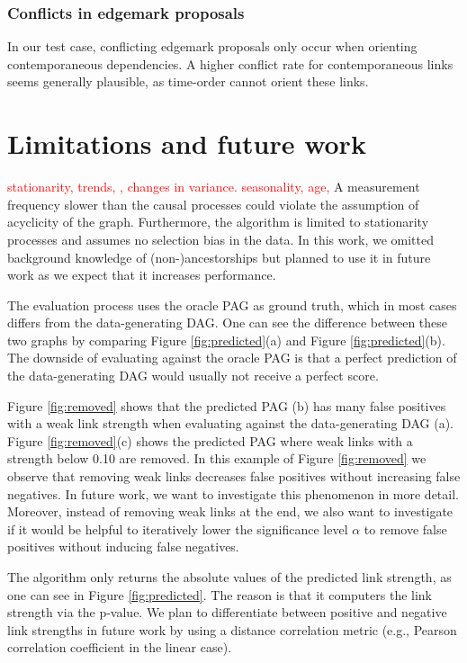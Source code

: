 \documentclass[conference]{IEEEtran}
\begin{document}
\subsubsection{Conflicts in edgemark proposals}
In our test case, conflicting edgemark proposals only occur when orienting contemporaneous dependencies. A higher conflict rate for contemporaneous links seems generally plausible, as time-order cannot orient these links.



\section{Limitations and future work}
\textcolor{red}{stationarity, trends, , changes in variance. seasonality, age, }
A measurement frequency slower than the causal processes could violate the assumption of acyclicity of the graph. 
Furthermore, the algorithm is limited to stationarity processes and assumes no selection bias in the data.
In this work, we omitted background knowledge of (non-)ancestorships but planned to use it in future work as we expect that it increases performance.

The evaluation process uses the oracle PAG as ground truth, which in most cases differs from the data-generating DAG. One can see the difference between these two graphs by comparing Figure \ref{fig:predicted}(a) and Figure \ref{fig:predicted}(b). The downside of evaluating against the oracle PAG is that a perfect prediction of the data-generating DAG would usually not receive a perfect score.

Figure \ref{fig:removed} shows that the predicted PAG (b) has many false positives with a weak link strength when evaluating against the data-generating DAG (a). Figure \ref{fig:removed}(c) shows the predicted PAG where weak links with a strength below 0.10 are removed. In this example of Figure \ref{fig:removed} we observe that removing weak links decreases false positives without increasing false negatives. In future work, we want to investigate this phenomenon in more detail. Moreover, instead of removing weak links at the end, we also want to investigate if it would be helpful to iteratively lower the significance level $\alpha$ to remove false positives without inducing false negatives.

The algorithm only returns the absolute values of the predicted link strength, as one can see in Figure \ref{fig:predicted}. The reason is that it computers the link strength via the p-value. We plan to differentiate between positive and negative link strengths in future work by using a distance correlation metric (e.g., Pearson correlation coefficient in the linear case).
\end{document}
